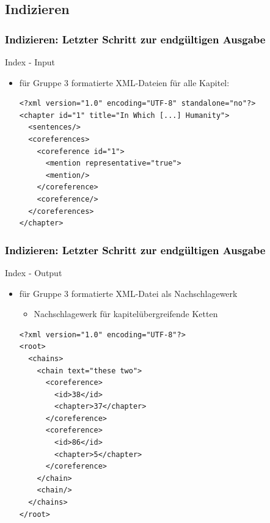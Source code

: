 \documentclass[xcolor=dvipsnames]{beamer}
\begin{document}


\subsection{Indizieren}


\begin{frame}[fragile]\frametitle{\textcolor{black}{Indizieren: Letzter Schritt zur endgültigen Ausgabe}}

\begin{block}{Index - Input}
\begin{itemize}
\item für Gruppe 3 formatierte XML-Dateien für alle Kapitel: 
\begin{small}\begin{verbatim}
<?xml version="1.0" encoding="UTF-8" standalone="no"?>
<chapter id="1" title="In Which [...] Humanity">
  <sentences/>
  <coreferences>
    <coreference id="1">
      <mention representative="true">
      <mention/>
    </coreference>
    <coreference/>
  </coreferences>
</chapter>
\end{verbatim}
\end{small}
\end{itemize}
\end{block}

\end{frame}

\begin{frame}[fragile]\frametitle{\textcolor{black}{Indizieren: Letzter Schritt zur endgültigen Ausgabe}}

\begin{block}{Index - Output}
\begin{itemize}
\item für Gruppe 3 formatierte XML-Datei als Nachschlagewerk
\begin{itemize}
\item Nachschlagewerk für kapitelübergreifende Ketten
\end{itemize}
\begin{small}\begin{verbatim}
<?xml version="1.0" encoding="UTF-8"?>
<root>
  <chains>
    <chain text="these two">
      <coreference>
        <id>38</id>
        <chapter>37</chapter>
      </coreference>
      <coreference>
        <id>86</id>
        <chapter>5</chapter>
      </coreference>
    </chain>
    <chain/>
  </chains>
</root>
\end{verbatim}
\end{small}
\end{itemize}
\end{block}

\end{frame}
\end{document}
